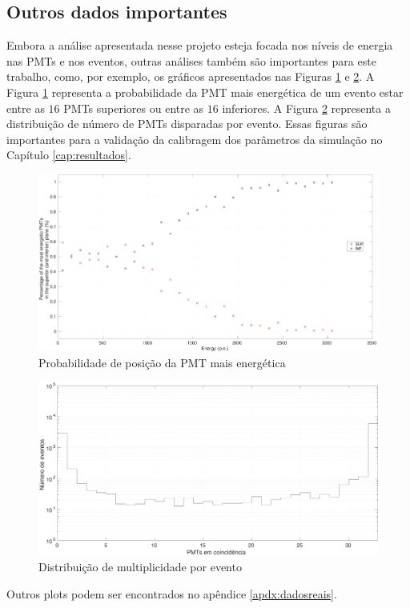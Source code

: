 \subsection{Outros dados importantes}

Embora a análise apresentada nesse projeto esteja focada nos níveis de energia nas PMTs e nos eventos, outras análises também são importantes para este trabalho, como, por exemplo, os gráficos apresentados nas Figuras \ref{fig:probsubinf_real} e \ref{fig:firedpmt_real}.
A Figura \ref{fig:probsubinf_real} representa a probabilidade da PMT mais energética de um evento estar entre as $16$ PMTs superiores ou entre as $16$ inferiores.
A Figura \ref{fig:firedpmt_real} representa a distribuição de número de PMTs disparadas por evento.
Essas figuras são importantes para a validação da calibragem dos parâmetros da simulação no Capítulo \ref{cap:resultados}.

\begin{figure}[H]
	\centering
	\includegraphics[width=12cm]{textuais/dadosreais/figuras/probsupinf_real.pdf}
	\caption{Probabilidade de posição da PMT mais energética}
	\label{fig:probsubinf_real}
\end{figure}


\begin{figure}[H]
	\centering
	\includegraphics[width=12cm]{textuais/dadosreais/figuras/firedpmt_real.pdf}
	\caption{Distribuição de multiplicidade por evento}
	\label{fig:firedpmt_real}
\end{figure}

Outros plots podem ser encontrados no apêndice \ref{apdx:dadosreais}.